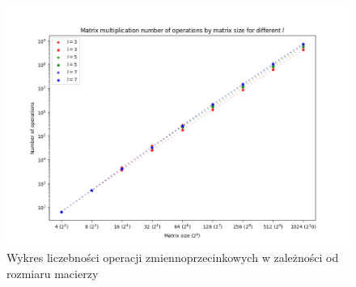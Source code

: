 \documentclass{article}
\begin{document}
\begin{figure}
  \centering
  \includegraphics[width=\linewidth]{log_operations_counter_scatter_plot.png}
  \caption{Wykres liczebności operacji zmiennoprzecinkowych w zależności od rozmiaru macierzy}
\end{figure}
\end{document}

